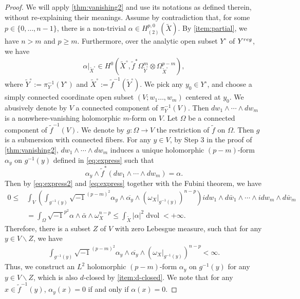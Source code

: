 \documentclass[11pt,a4paper,english]{smfart}
\theoremstyle{plain}
\theoremstyle{definition}
\theoremstyle{plain}
\DeclareMathOperator{\dvol}{dvol}
\begin{document}
\begin{proof}
	 We will apply \cref{thm:vanishing2} and use its notations as defined therein, without re-explaining their meanings.  Assume by contradiction that, for some $p\in \{0,\ldots,n-1\}$, there is a non-trivial $\alpha\in H^{p,0}_{(2)}(\widetilde{X})$. By \cref{item:partial},  we have $n>m$ and $p\geq m$. Furthermore, over the analytic open subset $Y^\circ$ of  $Y^{\rm reg}$, 
	we have   \begin{align*} 
		\alpha|_{\widetilde{X}^\circ}\in H^0(\widetilde{X}^\circ, \tilde{f}^*\Omega_{\widetilde{Y}^\circ}^{m}\otimes \Omega_{\widetilde{X}^\circ}^{p-m}), 
	\end{align*}
	where $\widetilde{Y}^\circ:= \pi_Y^{-1}(Y^\circ)$ and $\widetilde{X}^\circ:=\tilde{f}^{-1}(\widetilde{Y}^\circ)$.   We pick any  $y_0\in  {Y}^\circ$, and choose a simply connected coordinate open subset $(V;w_1\ldots,w_m)$ centered at $y_0$.  We  abusively denote by  $V$ a connected component of $\pi_Y^{-1}(V)$. Then $dw_1\wedge \cdots\wedge dw_m$ is a nonwhere-vanishing holomorphic $m$-form on $V$. Let $\Omega$ be a connected component of $\tilde{f}^{-1}(V)$.  We denote by $g:\Omega\to V$ the restriction of $\tilde{f}$  on $\Omega$. Then $g$ is a submersion with connected fibers. For any $y\in V$, by Step 3 in the proof of \cref{thm:vanishing2},  $dw_1\wedge \cdots\wedge dw_m$  induces  a unique holomorphic $(p-m)$-form $\alpha_{y}$ on  $g^{-1}(y)$ defined in \eqref{eq:express}  such that  $$\alpha_y\wedge \tilde{f}^*(dw_1\wedge \cdots\wedge dw_m)=\alpha.$$%
	Then by \eqref{eq:express2} and \eqref{eq:express}   together with the Fubini theorem,  we have
	\begin{align*}
		0\leq &\int_{V} \left(\int_{g^{-1}(y)}\sqrt{-1}^{(p-m)^2}\alpha_{y}\wedge \overline{\alpha_{y}}\wedge (\omega_X|_{g^{-1}(y)})^{n-p}\right) idw_1\wedge d\bar{w}_1\wedge\cdots\wedge  idw_m\wedge d\bar{w}_m\\
		&	 = \int_\Omega \sqrt{-1}^{p^2}\alpha\wedge \bar{\alpha}\wedge \omega_X^{n-p} \leq \int_{\widetilde{X}}|\alpha|^2\dvol<+\infty. 
	\end{align*} 
	Therefore,  there is a subset $Z$ of $V$ with zero Lebesgue measure,  such that for any $y\in V\backslash Z$, we have
	\begin{align}\label{eq:L2}
		\int_{g^{-1}(y)}\sqrt{-1}^{(p-m)^2}\alpha_{y}\wedge \overline{\alpha_{y}}\wedge (\omega_X|_{g^{-1}(y)})^{n-p}<\infty.
	\end{align} 
	Thus, we   construct an $L^2$ holomorphic $(p-m)$-form $\alpha_y$ on $g^{-1}(y)$ for any $y\in V\backslash Z$, which is also $d$-closed by \cref{item:d-closed}. We note that  for any $x\in \tilde{f}^{-1}(y)$,   $\alpha_y(x)=0$ if and only if $\alpha(x)=0$.
	

\end{proof}
\end{document}
